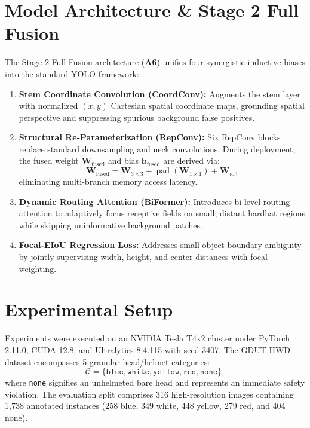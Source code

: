 \documentclass[conference]{IEEEtran}
\begin{document}
\section{Model Architecture \& Stage 2 Full Fusion}
The Stage 2 Full-Fusion architecture (\textbf{A6}) unifies four synergistic inductive biases into the standard YOLO framework:
\begin{enumerate}
    \item \textbf{Stem Coordinate Convolution (CoordConv):} Augments the stem layer with normalized $(x, y)$ Cartesian spatial coordinate maps, grounding spatial perspective and suppressing spurious background false positives.
    \item \textbf{Structural Re-Parameterization (RepConv):} Six RepConv blocks replace standard downsampling and neck convolutions. During deployment, the fused weight $\mathbf{W}_{\text{fused}}$ and bias $\mathbf{b}_{\text{fused}}$ are derived via:
    \begin{equation}
        \mathbf{W}_{\text{fused}} = \mathbf{W}_{3\times3} + \operatorname{pad}(\mathbf{W}_{1\times1}) + \mathbf{W}_{\text{id}},
    \end{equation}
    eliminating multi-branch memory access latency.
    \item \textbf{Dynamic Routing Attention (BiFormer):} Introduces bi-level routing attention to adaptively focus receptive fields on small, distant hardhat regions while skipping uninformative background patches.
    \item \textbf{Focal-EIoU Regression Loss:} Addresses small-object boundary ambiguity by jointly supervising width, height, and center distances with focal weighting.
\end{enumerate}

\section{Experimental Setup}
Experiments were executed on an NVIDIA Tesla T4x2 cluster under PyTorch 2.11.0, CUDA 12.8, and Ultralytics 8.4.115 with seed 3407. The GDUT-HWD dataset encompasses 5 granular head/helmet categories:
\begin{equation}
    \mathcal{C} = \{\texttt{blue}, \texttt{white}, \texttt{yellow}, \texttt{red}, \texttt{none}\},
\end{equation}
where \texttt{none} signifies an unhelmeted bare head and represents an immediate safety violation. The evaluation split comprises 316 high-resolution images containing 1,738 annotated instances (258 blue, 349 white, 448 yellow, 279 red, and 404 none).
\end{document}
